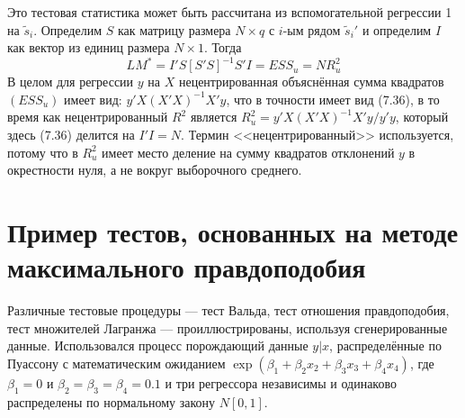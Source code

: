 Это тестовая статистика может быть рассчитана из вспомогательной регрессии 1 на $\tilde{s}_i$. Определим $S$ как матрицу размера $N \times q$ с $i$-ым рядом $\tilde{s}_i'$ и определим $I$ как вектор из единиц размера $N \times 1$. Тогда
\begin{equation}
LM^* = I'S[S'S]^{-1}S'I = ESS_u = NR_u^2
\end{equation}
В целом для регрессии $y$ на $X$ нецентрированная объяснённая сумма квадратов $(ESS_u)$ имеет вид: $y'X(X'X)^{-1}X'y$, что в точности имеет вид (7.36), в то время как нецентрированный $R^2$ является $R_u^2 = y'X(X'X)^{-1}X'y/y'y$, который здесь (7.36) делится на $I'I = N$. Термин <<нецентрированный>> используется, потому что в $R_u^2$ имеет место деление на сумму квадратов отклонений $y$ в окрестности нуля, а не вокруг выборочного среднего.

\section{Пример тестов, основанных на методе максимального правдоподобия}

Различные тестовые процедуры --- тест Вальда, тест отношения правдоподобия, тест множителей Лагранжа --- проиллюстрированы, используя сгенерированные данные. Использовался процесс порождающий данные $y|x$, распределённые по Пуассону с математическим ожиданием $\exp(\beta_1 + \beta_2 x_2 + \beta_3 x_3 + \beta_4 x_4)$, где $\beta_1 = 0$  и $\beta_2 = \beta_3 = \beta_4 = 0.1$ и три регрессора независимы и одинаково распределены по нормальному закону $N[0,1]$.

